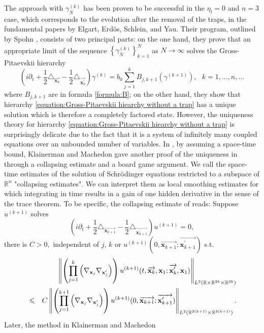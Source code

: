 \documentclass[reqno]{amsart}
\theoremstyle{plain}
\numberwithin{equation}{section}
\begin{document}
The approach with $\gamma _{N}^{(k)}$ has been proven to be successful in
the $\eta _{l}=0$ and $n=3$ case, which corresponds to the evolution after
the removal of the traps, in the fundamental papers \cite{E-E-S-Y1, E-Y1,
E-S-Y1,E-S-Y2,E-S-Y4, E-S-Y5, E-S-Y3} by Elgart, Erd\"{o}s, Schlein, and
Yau. Their program, outlined by Spohn \cite{Spohn}, consists of two
principal parts: on the one hand, they prove that an appropriate limit of
the sequence $\left\{ \gamma _{N}^{(k)}\right\} _{k=1}^{N}$ as $N\rightarrow
\infty $ solves the Gross-Pitaevskii hierarchy 
\begin{equation}
\left( i\partial _{t}+\frac{1}{2}\triangle _{\overrightarrow{\mathbf{x}_{k}}}-\frac{1}{2}\triangle _{\overrightarrow{\mathbf{x}_{k}^{\prime }}}\right)
\gamma ^{(k)}=b_{0}\sum_{j=1}^{k}B_{j,k+1}\left( \gamma ^{(k+1)}\right) ,\text{ }k=1,...,n,...
\label{equation:Gross-Pitaevskii hiearchy without a trap}
\end{equation}where $B_{j,k+1}$ are in formula \ref{formula:B}; on the other hand, they
show that hierarchy \ref{equation:Gross-Pitaevskii hiearchy without a trap}
has a unique solution which is therefore a completely factored state.
However, the uniqueness theory for hierarchy \ref{equation:Gross-Pitaevskii
hiearchy without a trap} is surprisingly delicate due to the fact that it is
a system of infinitely many coupled equations over an unbounded number of
variables. In \cite{KlainermanAndMachedon}, by assuming a space-time bound,
Klainerman and Machedon gave another proof of the uniqueness in \cite{E-S-Y2}
through a collapsing estimate and a board game argument. We call the
space-time estimates of the solution of Schr\"{o}dinger equations restricted
to a subspace of $\mathbb{R}^{n}$ "collapsing estimates". We can interpret
them as local smoothing estimates for which integrating in time results in a
gain of one hidden derivative in the sense of the trace theorem. To be
specific, the collapsing estimate of \cite{KlainermanAndMachedon} reads:
Suppose $u^{(k+1)}$ solves\begin{equation*}
\left( i\partial _{t}+\frac{1}{2}\triangle _{\overrightarrow{\mathbf{x}_{k+1}}}-\frac{1}{2}\triangle _{\overrightarrow{\mathbf{x}_{k+1}^{\prime }}}\right) u^{(k+1)}=0,
\end{equation*}there is $C>0,$ independent of $j$, $k$ or $u^{(k+1)}(0,\overrightarrow{\mathbf{x}_{k+1}};\overrightarrow{\mathbf{x}_{k+1}^{\prime }})$ s.t. 
\begin{eqnarray}
&&\left\Vert \left( \prod_{j=1}^{k}\left( \nabla _{\mathbf{x}_{j}}\nabla _{\mathbf{x}_{j}^{\prime }}\right) \right) u^{(k+1)}(t,\overrightarrow{\mathbf{x}_{k}},\mathbf{x}_{1};\overrightarrow{\mathbf{x}_{k}^{\prime }},\mathbf{x}_{1})\right\Vert _{L^{2}(\mathbb{R}\times \mathbb{R}^{3k}\times \mathbb{R}^{3k})}  \label{estimate:KeyEstimateInKlainermanMachedon} \\
&\leqslant &C\left\Vert \left( \prod_{j=1}^{k+1}\left( \nabla _{\mathbf{x}_{j}}\nabla _{\mathbf{x}_{j}^{\prime }}\right) \right) u^{(k+1)}(0,\overrightarrow{\mathbf{x}_{k+1}};\overrightarrow{\mathbf{x}_{k+1}^{\prime }})\right\Vert _{L^{2}(\mathbb{R}^{3(k+1)}\times \mathbb{R}^{3(k+1)})}.  \notag
\end{eqnarray}Later, the method in Klainerman and Machedon \cite{KlainermanAndMachedon}
\end{document}
